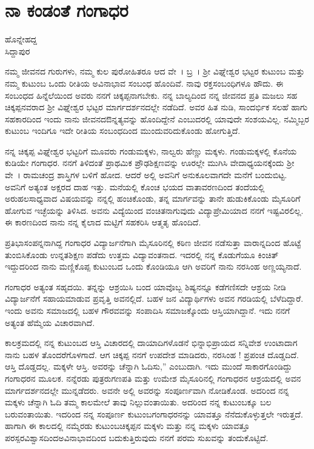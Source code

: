 {\fontsize{14}{16}\selectfont
\chapter{ನಾ ಕಂಡಂತೆ ಗಂಗಾಧರ}

\begin{center}
\smallskip

ಹೊನ್ನೇಹದ್ದ\\ 
ಸಿದ್ದಾಪುರ
\addrule
\end{center}

ನಮ್ಮ ಜೀವನದ ಗುರುಗಳು, ನಮ್ಮ ಕುಲ ಪುರೋಹಿತರೂ ಆದ ವೇ~। ಬ್ರ~। ಶ್ರೀ ವಿಘ್ನೇಶ್ವರ ಭಟ್ಟರ ಕುಟುಂಬ ಮತ್ತು ನಮ್ಮ ಕುಟುಂಬ ಒಂದು ರೀತಿಯ ಅವಿನಾಭಾವ ಸಂಬಂಧ ಹೊಂದಿವೆ. ನಾವು ರಕ್ತಸಂಬಂಧಿಗಳೂ ಹೌದು. ಈ ಸಂಬಂಧದ ಹಿನ್ನೆಲೆಯಿಂದ ಅವರು ನನಗೆ ಚಿಕ್ಕಪ್ಪನಾಗಬೇಕು. ನನ್ನ ಬಾಲ್ಯದಿಂದ ನನ್ನ ಜೀವನದ ಪ್ರತಿ ಮಜಲು ಸಹ ಚಿಕ್ಕಪ್ಪನವರಾದ ಶ್ರೀ ವಿಘ್ನೇಶ್ವರ ಭಟ್ಟರ ಮಾರ್ಗದರ್ಶನದಲ್ಲೇ ನಡೆದಿದೆ. ಅವರ ಹಿತ ನುಡಿ, ಸಾಂದರ್ಭಿಕ ಸಲಹೆ ಹಾಗು ಸಹಕಾರದಿಂದ ಇಂದು ನಾನು ಜೀವನದ\break ಔನ್ನತ್ಯವನ್ನು ಹೊಂದಿದ್ದೇನೆ ಎಂಬುದರಲ್ಲಿ ಯಾವುದೇ ಸಂಶಯವಿಲ್ಲ. ನಮ್ಮಿಬ್ಬರ ಕುಟುಂಬ ಇಂದಿಗೂ ಇದೇ ರೀತಿಯ ಸಂಬಂಧದಿಂದ ಮುಂದುವರಿದುಕೊಂಡು ಹೋಗುತ್ತಿದೆ.

ನನ್ನ ಚಿಕ್ಕಪ್ಪ ವಿಘ್ನೇಶ್ವರ ಭಟ್ಟರಿಗೆ ಮೂವರು ಗಂಡುಮಕ್ಕಳು, ನಾಲ್ವರು ಹೆಣ್ಣು ಮಕ್ಕಳು. ಗಂಡುಮಕ್ಕಳಲ್ಲಿ ಕೊನೆಯ ಕುಡಿಯೇ ಗಂಗಾಧರ. ನನಗೆ ತಿಳಿದಂತೆ ಪ್ರಾಥಮಿಕ ಪ್ರೌಢಶಿಕ್ಷಣವನ್ನು ಊರಲ್ಲೇ ಮುಗಿಸಿ ವೇದಾಧ್ಯಯನಕ್ಕೆಂದು ಶ್ರೀ ವೇ~। ರಾಮಚಂದ್ರ ಶಾಸ್ತ್ರಿಗಳ ಬಳಿಗೆ ಹೋದ. ಆದರೆ ಅಲ್ಲಿ ಅವನಿಗೆ ಅನುಕೂಲವಾಗದೇ ಮನೆಗೆ ಬಂದುಬಿಟ್ಟ. ಅವನಿಗೆ ಅತ್ಯಂತ ಅಕ್ಷರದ ದಾಹ ಇತ್ತು. ಮನೆಯಲ್ಲಿ ಕೊಂಚ ಭಯದ ವಾತಾ\-ವರಣದಿಂದ ತಂದೆಯಲ್ಲಿ ಅರುಹಲಸಾಧ್ಯವಾದ ವಿಷಯವನ್ನು ನನ್ನಲ್ಲಿ ಹಂಚಿಕೊಂಡು, ತನ್ನ ಮಾರ್ಗವನ್ನು ತಾನೇ ಹುಡುಕಿಕೊಂಡು ಮೈಸೂರಿಗೆ ಹೋಗುವ ಇಚ್ಛೆಯನ್ನು ತಿಳಿಸಿದ. ಅವನು ವಿದ್ಯೆಯಿಂದ ವಂಚಿತನಾಗುವುದು ವಿದ್ಯಾಪ್ರೇಮಿಯಾದ ನನಗೆ ಇಷ್ಟವಿರಲಿಲ್ಲ.  ಈ ಕಾರಣದಿಂದ ನಾನು ನನ್ನ ಕೈಲಾದ ಮಟ್ಟಿಗೆ ಸಹಕರಿಸಿ  ಆತ್ಮತೃ ಹೊಂದಿದೆ.

ಪ್ರತಿಭಾಸಂಪನ್ನನಾಗಿದ್ದ ಗಂಗಾಧರ ವಿದ್ಯಾರ್ಜನೆಗಾಗಿ ಮೈಸೂರಿನಲ್ಲಿ ಕಠಿಣ ಜೀವನ ನಡೆಸುತ್ತಾ ವಾರಾನ್ನದಿಂದ ಹೊಟ್ಟೆ ತುಂಬಿಸಿಕೊಂಡು  ಉನ್ನತಶಿಕ್ಷಣ ಪಡೆದು ಉತ್ತಮ ವಿದ್ಯಾವಂತನಾದ. ಇದರಲ್ಲಿ ನನ್ನ ಕೊಡುಗೆಯೂ ಕಿಂಚಿತ್ ಇದ್ದುದರಿಂದ ನಾನು ಮಣ್ಣಿಕೊಪ್ಪ ಕುಟುಂಬದ ಒಂದು ಕೊಂಡಿಯೂ ಆಗಿ ಅವರಿಗೆ ನಾನು ನರಸಿಂಹ ಅಣ್ಣಯ್ಯನಾದೆ. 

ಗಂಗಾಧರ ಅತ್ಯಂತ ಸಹೃದಯಿ. ತನ್ನನ್ನು ಆಶ್ರಯಿಸಿ ಬಂದ ಯಾವೊಬ್ಬ ಶಿಷ್ಯನನ್ನೂ ಕಡೆಗಣಿಸದೇ ಆಶ್ರಯ ನೀಡಿ ವಿದ್ಯಾರ್ಜನೆಗೆ ಸಹಾಯಮಾಡುವ ಪ್ರವೃತ್ತಿ ಅವನಲ್ಲಿದೆ. ಬಹಳ ಜನ ವಿದ್ಯಾರ್ಥಿಗಳು ಅವನ ಗರಡಿಯಲ್ಲಿ ಬೆಳೆದಿದ್ದಾರೆ. ಇಂದು ಅವನು ಸಮಾಜದಲ್ಲಿ ಬಹಳ ಗೌರವವನ್ನು ಸಂಪಾದಿಸಿ ಸಮಾಜಕ್ಕೊಂದು ಆಸ್ತಿಯಾಗಿದ್ದಾನೆ. ಇದು ನನಗೆ ಅತ್ಯಂತ ಹೆಮ್ಮೆಯ ವಿಚಾರವಾಗಿದೆ.

ಕಾಲಕ್ರಮದಲ್ಲಿ ನನ್ನ ಕುಟುಂಬದ ಆಸ್ತಿ ವಿಚಾರದಲ್ಲಿ ದಾಯಾದಿಗಳೊಡನೆ ಭಿನ್ನಾಭಿಪ್ರಾಯದ ಸನ್ನಿವೇಶ ಉಂಟಾದಾಗ ನಾನು ಬಹಳ ತೊಂದರೆಗೊಳಗಾದೆ. ಆಗ ಚಿಕ್ಕಪ್ಪ ನನಗೆ ಉಪದೇಶ ಮಾಡಿದರು, ನರಸಿಂಹ ! ಪ್ರಪಂಚ ದೊಡ್ಡದಿದೆ. ಆಸ್ತಿ ದೊಡ್ಡದಲ್ಲ. ಮಕ್ಕಳೇ ಆಸ್ತಿ. ಅವರನ್ನು ಚೆನ್ನಾಗಿ ಓದಿಸು,” ಎಂಬುದಾಗಿ. ಇದು ಮುಂದೆ ಸಾಕಾರ\-ಗೊಂಡಿದ್ದು ಗಂಗಾಧರನ ಮೂಲಕ. ನನ್ನೆರಡು ಪುತ್ರರು\enginline{-}ಗಣಪತಿ ಮತ್ತು ಉಮೇಶ ಮೈಸೂರಿನಲ್ಲಿ ಗಂಗಾಧರನ ಆಶ್ರಯದಲ್ಲಿ ಅವನ ಮಾರ್ಗದರ್ಶನದಲ್ಲೇ ಮುನ್ನಡೆದರು. ಅವನೇ ಅಲ್ಲಿ ಅವರನ್ನು ಸಂಪೂರ್ಣವಾಗಿ ನೋಡಿಕೊಂಡ. ಅದರಿಂದ ನನ್ನ ಮಕ್ಕಳು ಚೆನ್ನಾಗಿ ಓದಿ ತಮ್ಮ ಕಾಲಮೇಲೆ ತಾವು ನಿಲ್ಲುವಂತಾಯಿತು.  ಅದರಿಂದ ನನ್ನ ಕುಟುಂಬಕ್ಕೂ  ಬಲ ಬರುವಂತಾಯಿತು. ಇದರಿಂದ ನನ್ನ ಸಂಪೂರ್ಣ ಕುಟುಂಬ\break ಗಂಗಾಧರನನ್ನು ಯಾವತ್ತೂ ನೆನೆದುಕೊಳ್ಳುತ್ತಲೇ ಇರುತ್ತದೆ. ಹಾಗಾಗಿ ಈ ಕಾಲದಲ್ಲಿ ನಮ್ಮೆರಡು ಕುಟುಂಬ\enginline{-}ಚಿಕ್ಕಪ್ಪನ ಮಕ್ಕಳು ಮತ್ತು ನನ್ನ ಮಕ್ಕಳು ಯಾವತ್ತೂ ಪರಸ್ಪರ\break ವಿಶ್ವಾಸದಿಂದ\enginline{-}ಅವಿನಾಭಾವದಿಂದ ಬದುಕುತ್ತಿರುವುದು ನನಗೆ ಪರಮ ಸುಖವನ್ನು ತಂದುಕೊಟ್ಟಿದೆ. 

}
